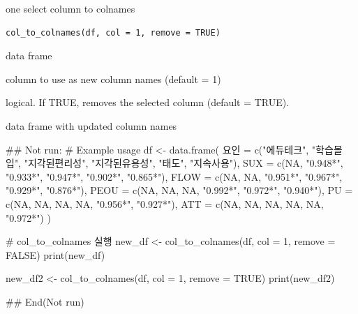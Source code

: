 \documentclass[a4paper]{book}
\begin{document}
%
\begin{Description}
one select column to colnames
\end{Description}
%
\begin{Usage}
\begin{verbatim}
col_to_colnames(df, col = 1, remove = TRUE)
\end{verbatim}
\end{Usage}
%
\begin{Arguments}
\begin{ldescription}
\item[\code{df}] data frame

\item[\code{col}] column to use as new column names (default = 1)

\item[\code{remove}] logical. If TRUE, removes the selected column (default = TRUE).
\end{ldescription}
\end{Arguments}
%
\begin{Value}
data frame with updated column names
\end{Value}
%
\begin{Examples}
\begin{ExampleCode}
\#\# Not run: 
# Example usage
df <- data.frame(
  요인 = c("에듀테크", "학습몰입", "지각된편리성", "지각된유용성", "태도", "지속사용"),
  SUX = c(NA, "0.948*", "0.933*", "0.947*", "0.902*", "0.865*"),
  FLOW = c(NA, NA, "0.951*", "0.967*", "0.929*", "0.876*"),
  PEOU = c(NA, NA, NA, "0.992*", "0.972*", "0.940*"),
  PU = c(NA, NA, NA, NA, "0.956*", "0.927*"),
  ATT = c(NA, NA, NA, NA, NA, "0.972*")
)

# col_to_colnames 실행
new_df <- col_to_colnames(df, col = 1, remove = FALSE)
print(new_df)

new_df2 <- col_to_colnames(df, col = 1, remove = TRUE)
print(new_df2)

## End(Not run)

\end{ExampleCode}
\end{Examples}
\end{document}
